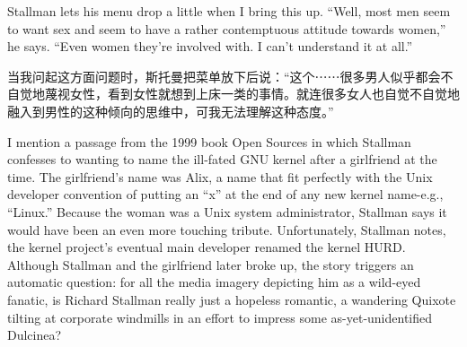 \ifdefined\eng
Stallman lets his menu drop a little when I bring this up. ``Well, most men seem to want sex and seem to have a rather contemptuous attitude towards women,'' he says. ``Even women they're involved with. I can't understand it at all.''
\fi

\ifdefined\chs
\ifdefined\spv
当我问起这方面问题时，斯托曼把菜单放下后说：``这个⋯⋯很多男人似乎都会不自觉地蔑视女性，看到女性就想到上床一类的事情。就连很多女人也自觉不自觉地融入到男性的这种倾向的思维中，可我无法理解这种态度。''
\fi
\fi

\ifdefined\eng
\ifdefined\vone
I mention a passage from the 1999 book Open Sources in which Stallman confesses to wanting to name the ill-fated GNU kernel after a girlfriend at the time. The girlfriend's name was Alix, a name that fit perfectly with the Unix developer convention of putting an ``x'' at the end of any new kernel name-e.g., ``Linux.'' Because the woman was a Unix system administrator, Stallman says it would have been an even more touching tribute. Unfortunately, Stallman notes, the kernel project's eventual main developer renamed the kernel HURD. Although Stallman and the girlfriend later broke up, the story triggers an automatic question: for all the media imagery depicting him as a wild-eyed fanatic, is Richard Stallman really just a hopeless romantic, a wandering Quixote tilting at corporate windmills in an effort to impress some as-yet-unidentified Dulcinea?
\fi
\ifdefined\vtwo
